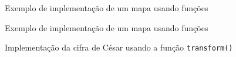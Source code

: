\begin{frame}[fragile]{Exemplo de implementação de um mapa usando funções}
\end{frame}

\begin{frame}[fragile]{Exemplo de implementação de um mapa usando funções}
\end{frame}

\begin{frame}[fragile]{Implementação da cifra de César usando a função \texttt{transform()}}
\end{frame}
